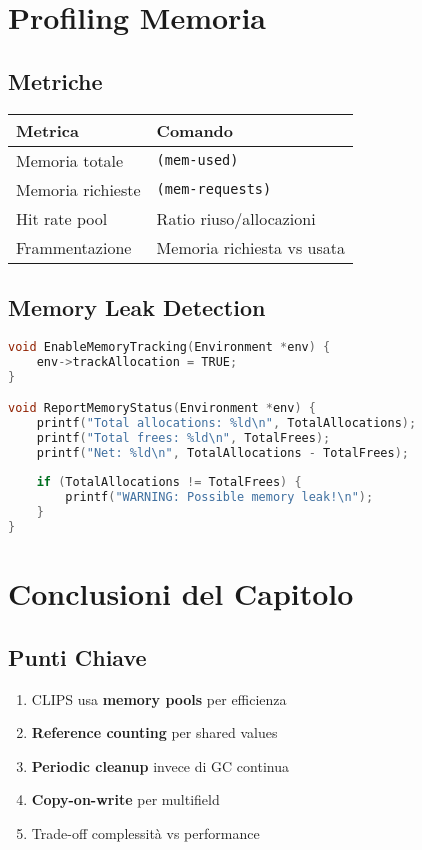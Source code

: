 \section{Profiling Memoria}

\subsection{Metriche}

\begin{table}[h]
\centering
\begin{tabular}{@{}ll@{}}
\toprule
\textbf{Metrica} & \textbf{Comando} \\
\midrule
Memoria totale & \texttt{(mem-used)} \\
Memoria richieste & \texttt{(mem-requests)} \\
Hit rate pool & Ratio riuso/allocazioni \\
Frammentazione & Memoria richiesta vs usata \\
\bottomrule
\end{tabular}
\end{table}

\subsection{Memory Leak Detection}

\begin{lstlisting}[language=C]
void EnableMemoryTracking(Environment *env) {
    env->trackAllocation = TRUE;
}

void ReportMemoryStatus(Environment *env) {
    printf("Total allocations: %ld\n", TotalAllocations);
    printf("Total frees: %ld\n", TotalFrees);
    printf("Net: %ld\n", TotalAllocations - TotalFrees);
    
    if (TotalAllocations != TotalFrees) {
        printf("WARNING: Possible memory leak!\n");
    }
}
\end{lstlisting}

\section{Conclusioni del Capitolo}

\subsection{Punti Chiave}

\begin{enumerate}
\item CLIPS usa \textbf{memory pools} per efficienza
\item \textbf{Reference counting} per shared values
\item \textbf{Periodic cleanup} invece di GC continua
\item \textbf{Copy-on-write} per multifield
\item Trade-off complessità vs performance
\end{enumerate}

